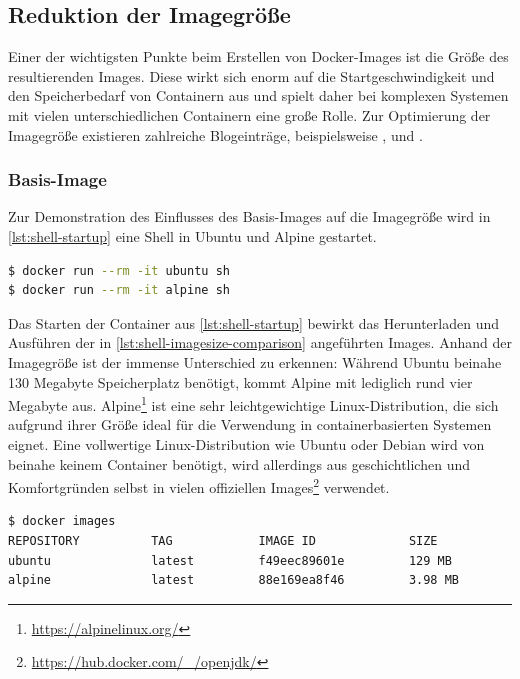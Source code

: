 \subsection{Reduktion der Imagegröße}
\label{sec:minimize-imagesize}
Einer der wichtigsten Punkte beim Erstellen von Docker-Images ist die Größe des resultierenden Images.
Diese wirkt sich enorm auf die Startgeschwindigkeit und den Speicherbedarf von Containern aus und spielt daher bei komplexen Systemen mit vielen unterschiedlichen Containern eine große Rolle.
Zur Optimierung der Imagegröße existieren zahlreiche Blogeinträge, beispielsweise \autocite{smallest-docker-container:online}, \autocite{alpine-real-world:online} und \autocite{docker-imagesize-refactoring:online}.
\subsubsection{Basis-Image}
Zur Demonstration des Einflusses des Basis-Images auf die Imagegröße wird in \cref{lst:shell-startup} eine Shell in Ubuntu und Alpine gestartet.

\begin{lstlisting}[caption=Starten einer Shell in unterschiedlichen Linux-Containern, language=bash, label=lst:shell-startup]
$ docker run --rm -it ubuntu sh
$ docker run --rm -it alpine sh
\end{lstlisting}
Das Starten der Container aus \cref{lst:shell-startup} bewirkt das Herunterladen und Ausführen der in \cref{lst:shell-imagesize-comparison} angeführten Images. Anhand der Imagegröße ist der immense Unterschied zu erkennen: Während Ubuntu beinahe 130 Megabyte Speicherplatz benötigt, kommt Alpine mit lediglich rund vier Megabyte aus.
Alpine\footnote{\url{https://alpinelinux.org/}} ist eine sehr leichtgewichtige Linux-Distribution, die sich aufgrund ihrer Größe ideal für die Verwendung in containerbasierten Systemen eignet.
Eine vollwertige Linux-Distribution wie Ubuntu oder Debian wird von beinahe keinem Container benötigt, wird allerdings aus geschichtlichen und Komfortgründen selbst in vielen offiziellen Images\footnote{\url{https://hub.docker.com/_/openjdk/}} verwendet.
\begin{lstlisting}[caption=Vergleich der Basis-Imagegröße, language=bash, label=lst:shell-imagesize-comparison]
$ docker images
REPOSITORY          TAG            IMAGE ID             SIZE
ubuntu              latest         f49eec89601e         129 MB
alpine              latest         88e169ea8f46         3.98 MB
\end{lstlisting}

